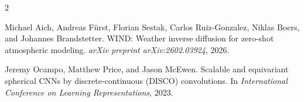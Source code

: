 \documentclass{article}
\begin{document}
\begin{thebibliography}{2}

Michael Aich, Andreas F{\"u}rst, Florian Sestak, Carlos Ruiz-Gonzalez, Niklas Boers, and Johannes Brandstetter.
\newblock WIND: Weather inverse diffusion for zero-shot atmospheric modeling.
\newblock \emph{arXiv preprint arXiv:2602.03924}, 2026.

Jeremy Ocampo, Matthew Price, and Jason McEwen.
\newblock Scalable and equivariant spherical CNNs by discrete-continuous (DISCO) convolutions.
\newblock In \emph{International Conference on Learning Representations}, 2023.

\end{thebibliography}
\end{document}
